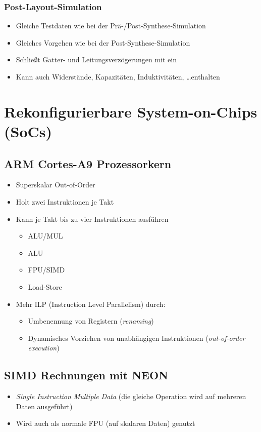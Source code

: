 		\subsection{Post-Layout-Simulation}
			\begin{itemize}
				\item Gleiche Testdaten wie bei der Prä-/Post-Synthese-Simulation
				\item Gleiches Vorgehen wie bei der Post-Synthese-Simulation
				\item Schließt Gatter- und Leitungsverzögerungen mit ein
				\item Kann auch Widerstände, Kapazitäten, Induktivitäten, \dots enthalten
			\end{itemize}

\chapter{Rekonfigurierbare System-on-Chips (SoCs)}
	\section{ARM Cortes-A9 Prozessorkern}
		\begin{itemize}
			\item Superskalar Out-of-Order
			\item Holt zwei Instruktionen je Takt
			\item Kann je Takt bis zu vier Instruktionen ausführen
				\begin{itemize}
					\item ALU/MUL
					\item ALU
					\item FPU/SIMD
					\item Load-Store
				\end{itemize}
			\item Mehr ILP (Instruction Level Parallelism) durch:
				\begin{itemize}
					\item Umbenennung von Registern (\textit{renaming})
					\item Dynamisches Vorziehen von unabhängigen Instruktionen (\textit{out-of-order execution})
				\end{itemize}
		\end{itemize}

	\section{SIMD Rechnungen mit NEON}
		\begin{itemize}
			\item \textit{Single Instruction Multiple Data} (die gleiche Operation wird auf mehreren Daten ausgeführt)
			\item Wird auch als normale FPU (auf skalaren Daten) genutzt
		\end{itemize}

